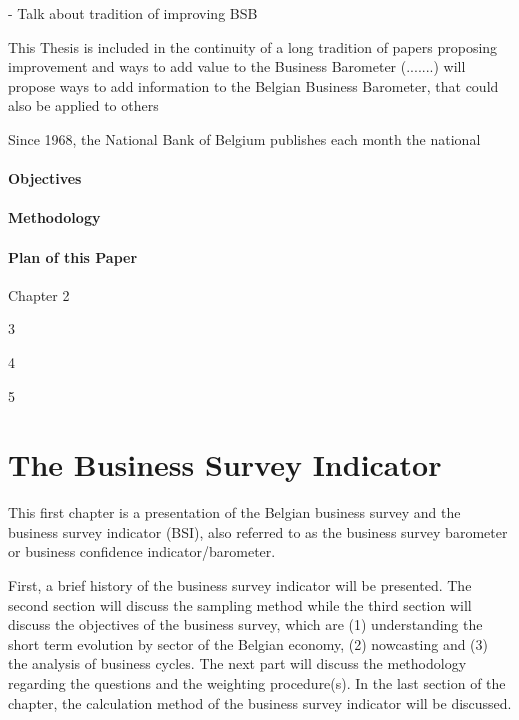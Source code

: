 \documentclass[12pt,a4paper,oneside]{book}
\begin{document}
- Talk about tradition of improving BSB

This Thesis is included in the continuity of a long tradition of papers proposing improvement and ways to add value to the Business Barometer (.......) will propose ways to add information to the Belgian Business Barometer, that could also be applied to others

Since 1968, the National Bank of Belgium publishes each month the national 




\subsubsection{Objectives}

\subsubsection{Methodology}

\subsubsection{Plan of this Paper}

Chapter 2

3

4

5





\chapter{The Business Survey Indicator}

This first chapter is a presentation of the Belgian business survey and the business survey indicator (BSI), also referred to as the business survey barometer or business confidence indicator/barometer.

First, a brief history of the business survey indicator will be presented.
The second section will discuss the sampling method while the third section will discuss the objectives of the business survey, which are (1) understanding the short term evolution by sector of the Belgian economy, (2) nowcasting and (3) the analysis of business cycles.
The next part will discuss the methodology regarding the questions and the weighting procedure(s).
In the last section of the chapter, the calculation method of the business survey indicator will be discussed.
\end{document}
